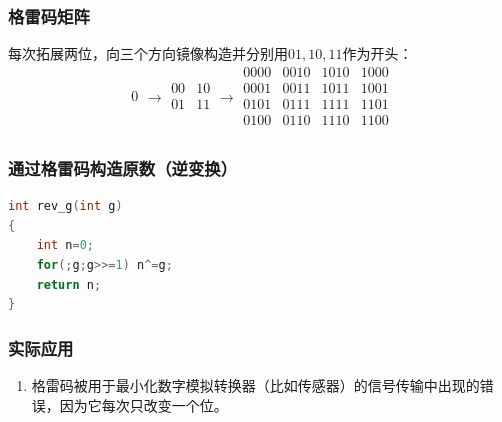 \documentclass[a4paper]{book}
\begin{document}
\subsubsection{格雷码矩阵}
每次拓展两位，向三个方向镜像构造并分别用$01,10,11$作为开头：
$$
\begin{matrix}
0 \\
\end{matrix}\to
\begin{matrix}
00& 10\\ 
01& 11 \\
\end{matrix}\to
\begin{matrix}
0000& 0010& 1010& 1000 \\
0001& 0011& 1011& 1001 \\
0101& 0111& 1111& 1101 \\
0100& 0110& 1110& 1100 \\
\end{matrix}
$$
\subsubsection{通过格雷码构造原数（逆变换）}
\begin{lstlisting}[language=c++]
int rev_g(int g) 
{
    int n=0;
    for(;g;g>>=1) n^=g;
    return n;
}
\end{lstlisting}
\subsubsection{实际应用}
\begin{enumerate}
    \item 格雷码被用于最小化数字模拟转换器（比如传感器）的信号传输中出现的错误，因为它每次只改变一个位。
\end{enumerate}
\end{document}
